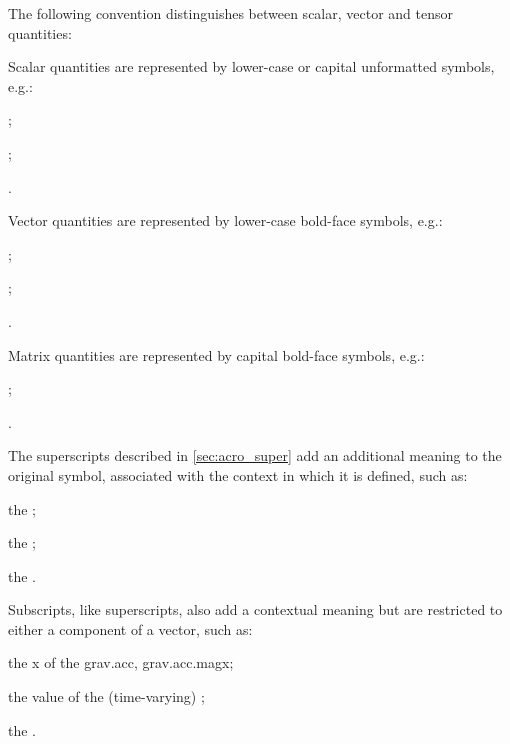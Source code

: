 
\newcommand{\symbolsleftmarginfix}{-1.7cm}
\newcommand{\symbolsrightmarginfix}{0.0cm}



\ifdefined\IncludeSymbolsText
The following convention distinguishes between scalar, vector and tensor quantities:
\begin{itemize*}
\item Scalar quantities are represented by lower-case or capital unformatted symbols, e.g.:
  \begin{itemize*}
  \item {};
  \item {};
  \item {}.
\end{itemize*}
\item Vector quantities are represented by lower-case bold-face symbols, e.g.:
  \begin{itemize*}
  \item {};
  \item {};
  \item {}.
  \end{itemize*}
\item Matrix quantities are represented by capital bold-face symbols, e.g.:
  \begin{itemize*}
  \item {};
  \item {}.
  \end{itemize*}
\end{itemize*}

The superscripts described in \ref{sec:acro_super} add an additional meaning to the original symbol, associated with the context in which it is defined, such as:
\begin{itemize*}
\item the ;
\item the ;
\item the .
\end{itemize*}

Subscripts, like superscripts, also add a contextual meaning but are restricted to either a component of a vector, such as:
\begin{itemize*}
\item the \acl{x} of the \acl{grav.acc}, \acs{grav.acc.mag}\acs{x};
\item the value of the (time-varying) ;
\item the .
\end{itemize*}


